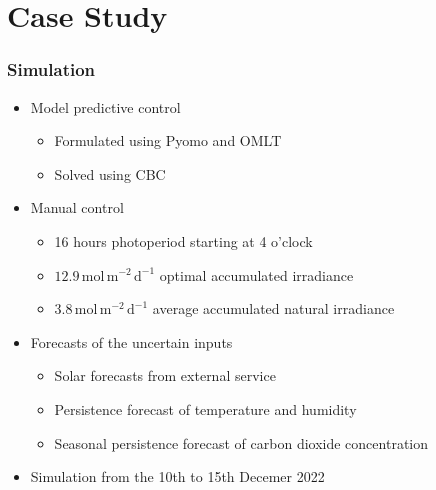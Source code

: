 
\section{Case Study}


\begin{frame}
    \frametitle{Simulation}
    
    \begin{itemize}
        \item Model predictive control
        \begin{itemize}
            \item Formulated using Pyomo and OMLT
            \item Solved using CBC 
        \end{itemize}
        \item Manual control
        \begin{itemize}
            \item 16 hours photoperiod starting at 4 o'clock
            \item $12.9 \, \mathrm{mol} \, \mathrm{m}^{-2} \, \mathrm{d}^{-1}$ optimal accumulated irradiance
            \item $3.8 \, \mathrm{mol} \, \mathrm{m}^{-2} \, \mathrm{d}^{-1}$ average accumulated natural irradiance 
        \end{itemize}
        \item Forecasts of the uncertain inputs
        \begin{itemize}
            \item Solar forecasts from external service
            \item Persistence forecast of temperature and humidity
            \item Seasonal persistence forecast of carbon dioxide concentration 
        \end{itemize}
        \item Simulation from the 10th to 15th Decemer 2022
    \end{itemize}
\end{frame}

